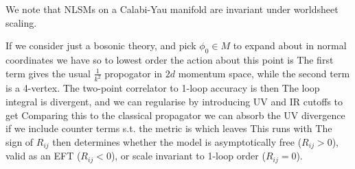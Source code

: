 \documentclass{article}
\begin{document}
\begin{remark}
	We note that NLSMs on a Calabi-Yau manifold are invariant under worldsheet scaling. 
\end{remark}
If we consider just a bosonic theory, and pick $\phi_0 \in M$ to expand about in normal coordinates we have 
so to lowest order the action about this point is 
The first term gives the usual $\frac{1}{k^2}$ propogator in $2d$ momentum space, while the second term is a 4-vertex. The two-point correlator to 1-loop accuracy is then 
The loop integral is divergent, and we can regularise by introducing UV and IR cutoffs to get  
Comparing this to the classical propagator we can absorb the UV divergence if we include counter terms s.t. the metric is 
which leaves
This runs with 
The sign of $R_{ij}$ then determines whether the model is asymptotically free ($R_{ij}>0$), valid as an EFT ($R_{ij}<0$), or scale invariant to 1-loop order ($R_{ij}=0$). 
\end{document}
